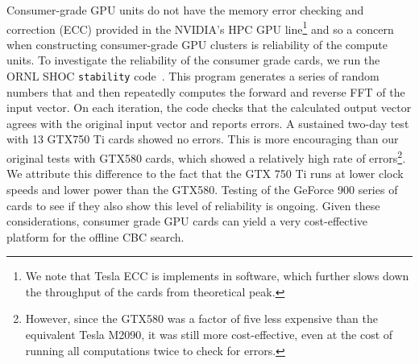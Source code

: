 Consumer-grade GPU units do not have the memory error checking and correction
(ECC) provided in the NVIDIA's HPC  GPU line\footnote{We note that Tesla ECC
is implements in software, which further slows down the throughput of the
cards from theoretical peak.} and so a concern when constructing
consumer-grade GPU clusters is reliability of the compute units. 
To investigate the reliability of the consumer grade cards, we run the ORNL
SHOC \texttt{stability} code~\cite{shoc}. This program generates a series of
random numbers that and then repeatedly computes the forward and reverse FFT
of the input vector.  On each iteration, the code checks that the calculated
output vector agrees with the original input vector and reports errors. A
sustained two-day test with 13 GTX750 Ti cards showed no errors. This
is more encouraging than our original tests with GTX580 cards, which showed a
relatively high rate of errors\footnote{However, since the GTX580 was a factor of five
less expensive than the equivalent Tesla M2090, it was still more
cost-effective, even at the cost of running all computations twice to check for errors.}.  We
attribute this difference to the fact that the GTX 750 Ti runs at lower clock
speeds and lower power than the GTX580. Testing of the GeForce 900 series
of cards to see if they also show this level of reliability is ongoing. Given
these considerations, consumer grade GPU cards can yield a very cost-effective 
platform for the offline CBC search. 


